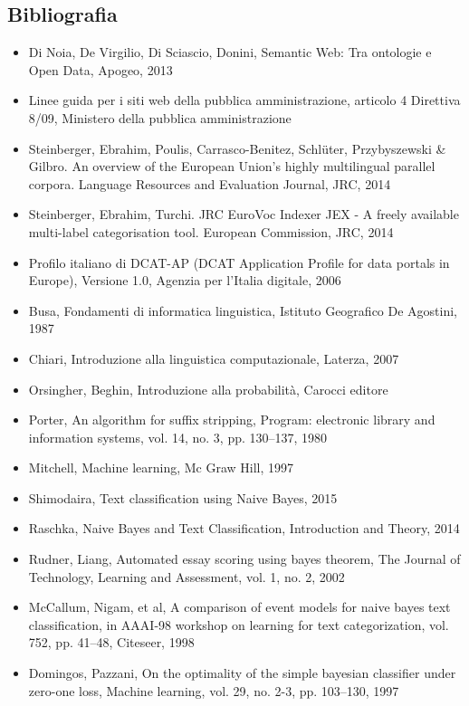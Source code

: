 \documentclass{article}
\theoremstyle{plain}
\theoremstyle{definition}
\begin{document}
\subsection{Bibliografia}
\begin{itemize}
\item Di Noia, De Virgilio, Di Sciascio, Donini, Semantic Web: Tra ontologie e Open Data, Apogeo, 2013
\item Linee guida per i siti web della pubblica amministrazione, articolo 4 Direttiva 8/09, Ministero della pubblica amministrazione
\item Steinberger, Ebrahim, Poulis, Carrasco-Benitez, Schlüter, Przybyszewski \& Gilbro. An overview of the European Union's highly multilingual parallel corpora. Language Resources and Evaluation Journal, JRC, 2014
\item Steinberger, Ebrahim, Turchi. JRC EuroVoc Indexer JEX - A freely available multi-label categorisation tool. European Commission, JRC, 2014
\item Profilo italiano di DCAT-AP (DCAT Application Profile for data portals in Europe), Versione 1.0, Agenzia per l'Italia digitale, 2006
\item Busa, Fondamenti di informatica linguistica, Istituto Geografico De Agostini, 1987
\item Chiari, Introduzione alla linguistica computazionale, Laterza, 2007
\item Orsingher, Beghin, Introduzione alla probabilità, Carocci editore
\item Porter, An algorithm for suffix stripping, Program: electronic library and information systems, vol. 14, no. 3, pp. 130–137, 1980
\item Mitchell, Machine learning, Mc Graw Hill, 1997
\item Shimodaira, Text classification using Naive Bayes, 2015
\item Raschka, Naive Bayes and Text Classification, Introduction and Theory, 2014
\item Rudner, Liang, Automated essay scoring using bayes theorem, The Journal of Technology, Learning and Assessment, vol. 1, no. 2, 2002
\item McCallum, Nigam, et al, A comparison of event models for naive bayes text classification, in AAAI-98 workshop on learning for text categorization, vol. 752, pp. 41–48, Citeseer, 1998
\item Domingos, Pazzani, On the optimality of the simple bayesian classifier under zero-one loss, Machine learning, vol. 29, no. 2-3, pp. 103–130, 1997

\end{itemize}
\end{document}

